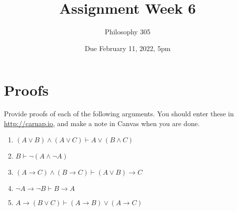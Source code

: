 \documentclass[
  11pt,
]{article}
\title{Assignment Week 6}
\author{Philosophy 305}
\date{Due February 11, 2022, 5pm}
\providecommand{\tightlist}{%
  \setlength{\itemsep}{0pt}\setlength{\parskip}{0pt}}
\begin{document}
\maketitle

\hypertarget{proofs}{%
\section{Proofs}\label{proofs}}

Provide proofs of each of the following arguments. You should enter
these in \url{http://carnap.io}, and make a note in Canvas when you are
done.

\begin{enumerate}
\def\labelenumi{\arabic{enumi}.}
\tightlist
\item
  \((A \vee B) \wedge (A \vee C) \vdash A \vee (B \wedge C)\)
\item
  \(B \vdash \neg (A \wedge \neg A)\)
\item
  \((A \rightarrow C) \wedge (B \rightarrow C) \vdash (A \vee B) \rightarrow C\)
\item
  \(\neg A \rightarrow \neg B \vdash B \rightarrow A\)
\item
  \(A \rightarrow (B \vee C) \vdash (A \rightarrow B) \vee (A \rightarrow C)\)
\end{enumerate}
\end{document}
